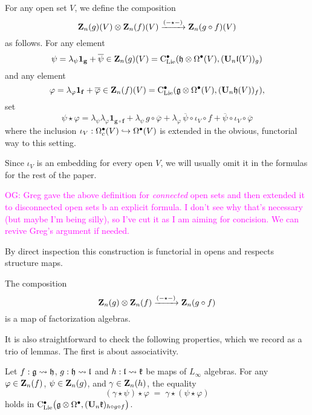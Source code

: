 \documentclass[11pt]{amsart}
\numberwithin{equation}{section}
\def\owen{\textcolor{magenta}{OG: }\textcolor{magenta}}
\begin{document}
\begin{dfn}
\label{def:comp}
For any open set $V$, we define the composition 
\[
\mathbf Z_n(g)(V) \otimes \mathbf Z_n(f)(V) \xrightarrow{(-\star-)} \mathbf Z_n(g \circ f)(V)
\]
as follows.
For any element
\[
\psi=\lambda_\psi {\bf 1_g} +\overline{\psi} \in \mathbf Z_n(g)(V) = {\rm C}_{\rm Lie}^\bullet(\mathfrak h \otimes \Omega^\bullet(V), (\mathbf U_n \mathfrak l (V))_g  )
\]
and any element
\[
\varphi =\lambda_\varphi {\bf 1_f} +\overline{\varphi}\in \mathbf Z_n(f)(V) = {\rm C}_{\rm Lie}^\bullet(\mathfrak g \otimes \Omega^\bullet(V), (\mathbf U_n \mathfrak h (V))_f  ),
\] 
set
\[
\psi \star \varphi =  
\lambda_{\psi} \lambda_{\varphi} \mathbf{1_{g\circ f}}
+ \lambda_\psi \,g \circ \overline{\varphi} 
+ \lambda_{\varphi}\, \overline{\psi} \circ \iota_V \circ f 
+\overline{\psi} \circ \iota_V \circ \overline{\varphi} 
\]
where the inclusion $\iota_V: \Omega^\bullet_c(V) \hookrightarrow \Omega^\bullet(V)$ is extended in the obvious, functorial way to this setting.
\end{dfn}

Since $\iota_V$ is an embedding for every open $V$, 
we will usually omit it in the formulas for the rest of the paper.

\owen{Greg gave the above definition for {\em connected} open sets and then extended it to disconnected open sets b an explicit formula. 
I don't see why that's necessary (but maybe I'm being silly), so I've cut it as I am aiming for concision.
We can revive Greg's argument if needed.}

By direct inspection this construction is functorial in opens and respects structure maps.

\begin{lmm}
\label{L:compisfacmap} 
The composition 
\[
 \mathbf Z_n(g) \otimes  \mathbf Z_n(f) \xrightarrow{(-\star-)}  \mathbf Z_n(g \circ f)
\]
 is a map of factorization algebras.
\end{lmm}

It is also straightforward to check the following properties,
which we record as a trio of lemmas.
The first is about associativity.

\begin{lmm}
\label{L:compisassociative} 
Let $f: \mathfrak g \rightsquigarrow \mathfrak h$, $g: \mathfrak h \rightsquigarrow \mathfrak l$ and $h: \mathfrak l \rightsquigarrow \mathfrak{k}$ be maps of $L_\infty$ algebras.
For any $\varphi \in \mathbf Z_n(f)$, $\psi \in \mathbf Z_n(g)$, and $\gamma \in \mathbf Z_n(h)$,  
the equality 
\[ 
(\gamma\star \psi)\star \varphi \;=\; \gamma\star (\psi \star \varphi)  
\]
holds in ${\rm C}_{\rm Lie}^\bullet\big(\mathfrak g\otimes \Omega^\bullet, (\mathbf U_n \mathfrak{k})_{h \circ g \circ f} \big)$.
\end{lmm}
\end{document}
